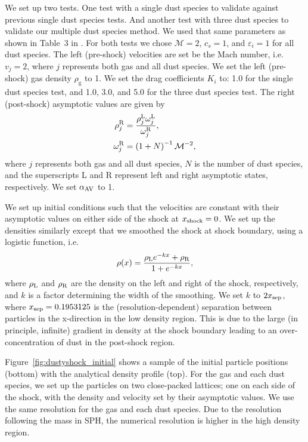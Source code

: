 \documentclass[fleqn,usenatbib]{mnras}
\newcommand{\g}{\mathrm{g}}
\begin{document}
We set up two tests. One test with a single dust species to validate against
previous single dust species tests. And another test with three dust species to
validate our multiple dust species method. We used that same parameters as shown
in Table~3 in \citet{Benitez-Llambay2019ApJS..241...25B}. For both tests we
chose \(\mathcal{M} = 2\), \(c_s = 1\), and \(\varepsilon_i = 1\) for all dust
species. The left (pre-shock) velocities are set be the Mach number, i.e. \(v_j=
2\), where \(j\) represents both gas and all dust species. We set the left
(pre-shock) gas density \(\rho_{\g}\) to 1. We set the drag coefficients \(K_i\)
to: 1.0 for the single dust species test, and 1.0, 3.0, and 5.0 for the three
dust species test. The right (post-shock) asymptotic values are given by
%
\begin{align}
   \rho_{j}^{\rm R} &=
      \frac{\rho_{j}^{\rm L} \omega_{j}^{\rm L}} {\omega_{j}^{\rm R}}, \\
   \omega_j^{\rm R} &= \left(1 + N \right)^{-1} \mathcal{M}^{-2},
\end{align}
%
where \(j\) represents both gas and all dust species, \(N\) is the number of
dust species, and the superscripts L and R represent left and right asymptotic
states, respectively. We set \(\alpha_{\rm AV}\) to 1.

We set up initial conditions such that the velocities are constant with their
asymptotic values on either side of the shock at \(x_{\rm shock} = 0\). We set
up the densities similarly except that we smoothed the shock at shock boundary,
using a logistic function, i.e.
%
\begin{align}
   \rho(x) = \frac{\rho_{\rm L} e^{-kx} + \rho_{\rm R}}{1 + e^{-kx}},
\end{align}
%
where \(\rho_{\rm L}\) and \(\rho_{\rm R}\) are the density on the left and
right of the shock, respectively, and \(k\) is a factor determining the width of
the smoothing. We set \(k\) to \(2 x_{\rm sep}\), where \(x_{\rm sep} =
0.1953125\) is the (resolution-dependent) separation between particles in the
x-direction in the low density region. This is due to the large (in principle,
infinite) gradient in density at the shock boundary leading to an
over-concentration of dust in the post-shock region.

Figure~\ref{fig:dustyshock_initial} shows a sample of the initial particle
positions (bottom) with the analytical density profile (top). For the gas and
each dust species, we set up the particles on two close-packed lattices; one on
each side of the shock, with the density and velocity set by their asymptotic
values. We use the same resolution for the gas and each dust species. Due to the
resolution following the mass in SPH, the numerical resolution is higher in the
high density region.
\end{document}

